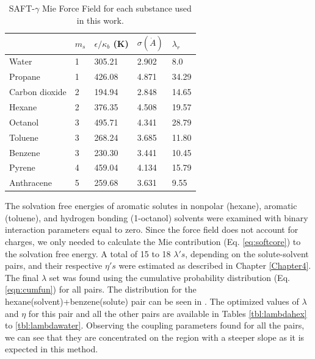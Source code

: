 \begin{table}[h]
\centering
  \caption{SAFT-$\gamma$ Mie Force Field for each substance used in this work.}
  \label{tbl:parameters}
  \begin{tabular}{lllll}
      \hline
      \hline
                     & $m_s$ & $\epsilon/\kappa_{b}$ (K) & $\sigma (\dot{A})$ & $\lambda_r$ \\ \hline
      Water          & 1     & 305.21               & 2.902              & 8.0         \\
      Propane        & 1     & 426.08               & 4.871              & 34.29       \\
      Carbon dioxide & 2     & 194.94               & 2.848              & 14.65       \\
      Hexane         & 2     & 376.35               & 4.508              & 19.57       \\
      Octanol        & 3     & 495.71               & 4.341              & 28.79       \\
      Toluene        & 3     & 268.24               & 3.685              & 11.80       \\
      Benzene        & 3     & 230.30               & 3.441              & 10.45       \\
      Pyrene         & 4     & 459.04               & 4.134              & 15.79       \\
      Anthracene     & 5     & 259.68               & 3.631              & 9.55        \\ 
      \hline
      \hline
  \end{tabular}

\end{table}
\FloatBarrier
The solvation free energies of aromatic solutes in nonpolar (hexane), aromatic (toluene), and hydrogen bonding (1-octanol) solvents were examined with binary interaction parameters equal to zero. Since the force field does not account for charges, we only needed to calculate the Mie contribution (Eq. \eqref{eq:softcore}) to the solvation free energy. A total of 15 to 18 $\lambda 's$, depending on the solute-solvent pairs, and their respective $\eta 's$ were estimated as described in Chapter \ref{Chapter4}. The final $\lambda$ set was found using  the cumulative probability distribution (Eq. \eqref{eqn:cumfun}) for all pairs. The distribution for the hexane(solvent)+benzene(solute) pair can be seen in . The optimized values of $\lambda$ and $\eta$ for this pair and all the other pairs are available in Tables \ref{tbl:lambdahex} to \ref{tbl:lambdawater}. Observing the coupling parameters found for all the pairs, we can see that they are concentrated on the region with a steeper slope as it is expected in this method.

